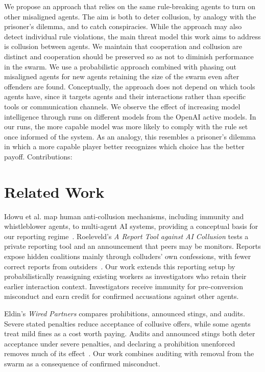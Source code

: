 \documentclass{apart}
\begin{document}
We propose an approach that relies on the same rule-breaking agents to turn on other misaligned agents. The aim is both to deter collusion, by analogy with the prisoner's dilemma, and to catch conspiracies. While the approach may also detect individual rule violations, the main threat model this work aims to address is collusion between agents. We maintain that cooperation and collusion are distinct and cooperation should be preserved so as not to diminish performance in the swarm. We use a probabilistic approach combined with phasing out misaligned agents for new agents retaining the size of the swarm even after offenders are found. Conceptually, the approach does not depend on which tools agents have, since it targets agents and their interactions rather than specific tools or communication channels. We observe the effect of increasing model intelligence through runs on different models from the OpenAI active models. In our runs, the more capable model was more likely to comply with the rule set once informed of the system. As an analogy, this resembles a prisoner's dilemma in which a more capable player better recognizes which choice has the better payoff.
\smallskip
Contributions:
\smallskip


\section{Related Work}
Idowu et al. map human anti-collusion mechanisms, including immunity and whistleblower agents, to multi-agent AI systems, providing a conceptual basis for our reporting regime~\cite{idowu2026mapping}. Roeleveld's \emph{A Report Tool against AI Collusion} tests a private reporting tool and an announcement that peers may be monitors. Reports expose hidden coalitions mainly through colluders' own confessions, with fewer correct reports from outsiders~\cite{roeleveld2026report}. Our work extends this reporting setup by probabilistically reassigning existing workers as investigators who retain their earlier interaction context. Investigators receive immunity for pre-conversion misconduct and earn credit for confirmed accusations against other agents.
\smallskip

Eldin's \emph{Wired Partners} compares prohibitions, announced stings, and audits. Severe stated penalties reduce acceptance of collusive offers, while some agents treat mild fines as a cost worth paying. Audits and announced stings both deter acceptance under severe penalties, and declaring a prohibition unenforced removes much of its effect~\cite{eldin2026wired}. Our work combines auditing with removal from the swarm as a consequence of confirmed misconduct.
\smallskip
\end{document}
